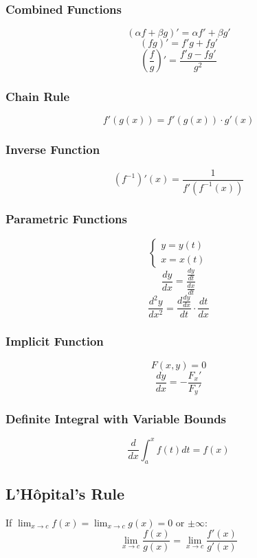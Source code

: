 \documentclass{article}
\begin{document}
\subsubsection{Combined Functions}

\[
    (\alpha f + \beta g)' = \alpha f' + \beta g'
\]
\[
    (fg)' = f'g + fg'
\]
\[
    \left(\frac{f}{g}\right)' = \frac{f'g - fg'}{g^2}
\]

\subsubsection{Chain Rule}

\[
    f'(g(x)) = f'(g(x)) \cdot g'(x)
\]

\subsubsection{Inverse Function}

\[
    (f^{-1})'(x) = \frac{1}{f'(f^{-1}(x))}
\]

\subsubsection{Parametric Functions}

\[
    \begin{cases}
        y = y(t) \\
        x = x(t)
    \end{cases}
\]
\[
    \frac{dy}{dx} = \frac{\frac{dy}{dt}}{\frac{dx}{dt}}
\]
\[
    \frac{d^2y}{dx^2} = \frac{d\frac{dy}{dx}}{dt} \cdot \frac{dt}{dx}
\]

\subsubsection{Implicit Function}

\[
    F(x, y) = 0
\]
\[
    \frac{dy}{dx} = -\frac{F_x'}{F_y'}
\]

\subsubsection{Definite Integral with Variable Bounds}

\[
    \frac{d}{dx} \int_a^x f(t) dt = f(x)
\]

\subsection{L'Hôpital's Rule}

If $\lim_{x \to c} f(x) = \lim_{x \to c} g(x) = 0$ or $\pm\infty$:
\[
    \lim_{x \to c} \frac{f(x)}{g(x)} = \lim_{x \to c} \frac{f'(x)}{g'(x)}
\]
\end{document}
